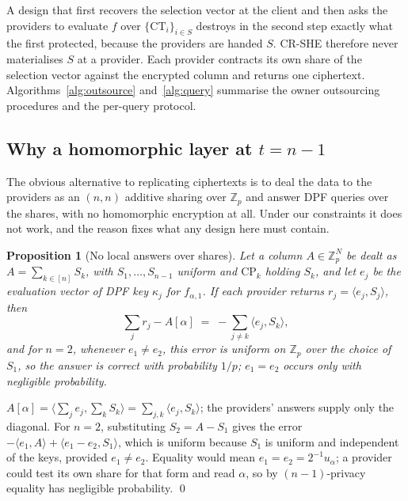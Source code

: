 \documentclass[a4paper,fleqn]{cas-sc}
\newtheorem{proposition}{Proposition}
\begin{document}
A design that first recovers the selection vector at the client and then asks
the providers to evaluate $f$ over $\{\text{CT}_i\}_{i\in S}$ destroys in the
second step exactly what the first protected, because the providers are handed
$S$. CR-SHE therefore never materialises $S$ at a provider. Each provider
contracts its own share of the selection vector against the encrypted column
and returns one ciphertext. Algorithms~\ref{alg:outsource} and~\ref{alg:query}
summarise the owner outsourcing procedures and the per-query protocol.

\subsection{Why a homomorphic layer at $t=n-1$}
\label{sec:whyrep}
The obvious alternative to replicating ciphertexts is to deal the data to the
providers as an $(n,n)$ additive sharing over $\mathbb{Z}_p$ and answer DPF
queries over the shares, with no homomorphic encryption at all. Under our
constraints it does not work, and the reason fixes what any design here must
contain.

\begin{proposition}[No local answers over shares]
\label{prop:nolocal}
Let a column $A\in\mathbb{Z}_p^N$ be dealt as $A=\sum_{k\in[n]}S_k$, with
$S_1,\dots,S_{n-1}$ uniform and $\text{CP}_k$ holding $S_k$, and let $e_j$ be
the evaluation vector of DPF key $\kappa_j$ for $f_{\alpha,1}$. If each
provider returns $r_j=\langle e_j,S_j\rangle$, then
\[
\textstyle\sum_{j} r_j - A[\alpha] \;=\; -\sum_{j\neq k}\langle e_j,S_k\rangle ,
\]
and for $n=2$, whenever $e_1\neq e_2$, this error is uniform on
$\mathbb{Z}_p$ over the choice of $S_1$, so the answer is correct with
probability $1/p$; $e_1=e_2$ occurs only with negligible probability.
\end{proposition}
\begin{pf}
$A[\alpha]=\langle\sum_j e_j,\sum_k S_k\rangle=\sum_{j,k}\langle e_j,S_k\rangle$;
the providers' answers supply only the diagonal. For $n=2$, substituting
$S_2=A-S_1$ gives the error $-\langle e_1,A\rangle+\langle e_1-e_2,S_1\rangle$,
which is uniform because $S_1$ is uniform and independent of the keys, provided
$e_1\neq e_2$. Equality would mean $e_1=e_2=2^{-1}u_\alpha$; a provider could
test its own share for that form and read $\alpha$, so by $(n{-}1)$-privacy
equality has negligible probability. \qed
\end{pf}
\end{document}
